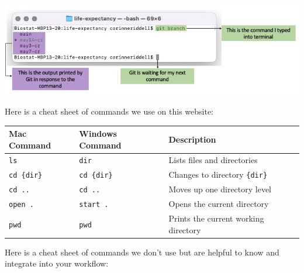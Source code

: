\documentclass[
]{book}
\begin{document}
\includegraphics[width=1\linewidth]{./figures/Terminal-explainer-2}

Here is a cheat sheet of commands we use on this website:

\begin{longtable}[]{@{}lll@{}}
\toprule\noalign{}
Mac Command & Windows Command & Description \\
\midrule\noalign{}
\endhead
\bottomrule\noalign{}
\endlastfoot
\texttt{ls} & \texttt{dir} & Lists files and directories \\
\texttt{cd\ \{dir\}} & \texttt{cd\ \{dir\}} & Changes to directory \texttt{\{dir\}} \\
\texttt{cd\ ..} & \texttt{cd\ ..} & Moves up one directory level \\
\texttt{open\ .} & \texttt{start\ .} & Opens the current directory \\
\texttt{pwd} & \texttt{pwd} & Prints the current working directory \\
\end{longtable}

Here is a cheat sheet of commands we don't use but are helpful to know and integrate
into your workflow:
\end{document}

